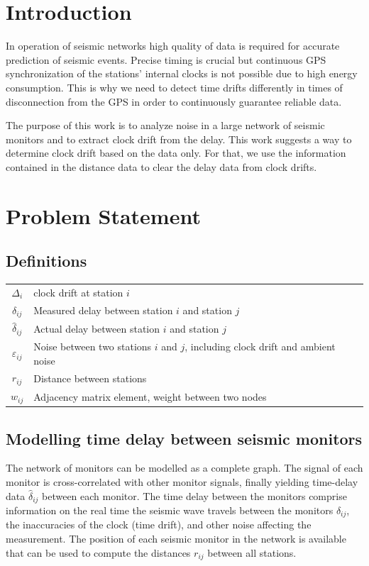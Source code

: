\documentclass[12pt, sumlimits, intlimits]{article}
\begin{document}

\clearpage

\tableofcontents

\clearpage

\section{Introduction}

In operation of seismic networks high quality of data is required for accurate prediction of seismic events. Precise timing is crucial but continuous GPS synchronization of the stations' internal clocks is not possible due to high energy consumption. This is why we need to detect time drifts differently in times of disconnection from the GPS in order to continuously guarantee reliable data.

The purpose of this work is to analyze noise in a large network of seismic monitors and to extract clock drift from the delay.  This work suggests a way to determine clock drift based on the data only. For that, we use the information contained in the distance data to clear the delay data from clock drifts.

\section{Problem Statement}

\subsection{Definitions}
\begin{tabular}{c| p{11cm}}
	$\Delta_i$ & clock drift at station $i$\\
	$\delta_{ij}$ & Measured delay between station $i$ and station $j$ \\
	$\hat{\delta}_{ij}$ & Actual delay between station $i$ and station $j$ \\
	$\varepsilon_{ij}$ & Noise between two stations $i$ and $j$, including clock drift and ambient noise \\
	$r_{ij}$ & Distance between stations \\
	$w_{ij}$ & Adjacency matrix element, weight between two nodes
\end{tabular}

\subsection{Modelling time delay between seismic monitors}
The network of monitors can be modelled as a complete graph. The signal of each monitor is cross-correlated with other monitor signals, finally yielding time-delay data $\hat{\delta}_{ij}$ between each monitor. The time delay between the monitors comprise information on the real time the seismic wave travels between the monitors $\delta_{ij}$, the inaccuracies of the clock (time drift), and other noise affecting the measurement. The position of each seismic monitor in the network is available that can be used to compute the distances $r_{ij}$ between all stations.
\end{document}
